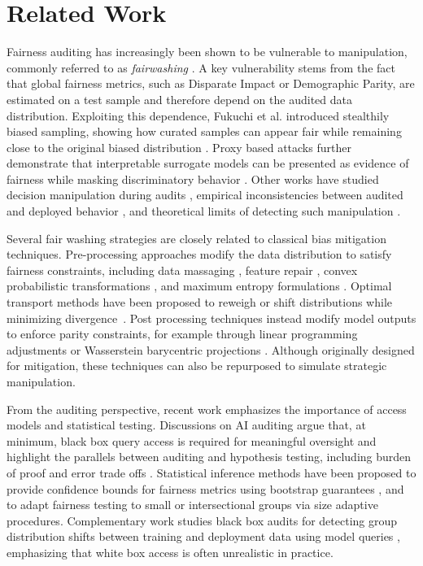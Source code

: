\documentclass[runningheads, orivec]{llncs}
\begin{document}
\section{Related Work}

Fairness auditing has increasingly been shown to be vulnerable to manipulation, commonly referred to as \emph{fairwashing} \cite{aivodji2019fairwashing}. A key vulnerability stems from the fact that global fairness metrics, such as Disparate Impact or Demographic Parity, are estimated on a test sample and therefore depend on the audited data distribution. Exploiting this dependence, Fukuchi et al. introduced stealthily biased sampling, showing how curated samples can appear fair while remaining close to the original biased distribution \cite{fukuchi2020faking}. Proxy based attacks further demonstrate that interpretable surrogate models can be presented as evidence of fairness while masking discriminatory behavior \cite{aivodji2019fairwashing}. Other works have studied decision manipulation during audits \cite{lemerrer2020faking}, empirical inconsistencies between audited and deployed behavior \cite{raji2020closing}, and theoretical limits of detecting such manipulation \cite{shamsabadi2023fairwashing}.

Several fair washing strategies are closely related to classical bias mitigation techniques. Pre-processing approaches modify the data distribution to satisfy fairness constraints, including data massaging \cite{kamiran2009classifying}, feature repair \cite{feldman2015certifying}, convex probabilistic transformations \cite{calmon2017optimized}, and maximum entropy formulations \cite{celis2019fair}. Optimal transport methods have been proposed to reweigh or shift distributions while minimizing divergence~\cite{gordaliza2019obtaining }. %
Post processing techniques instead modify model outputs to enforce parity constraints, for example through linear programming adjustments \cite{hardt2016equality} or Wasserstein barycentric projections \cite{pmlr-v115-jiang20a}. 
Although originally designed for mitigation, these techniques can also be repurposed to simulate strategic manipulation.

From the auditing perspective, recent work emphasizes the importance of access models and statistical testing. Discussions on AI auditing argue that, at minimum, black box query access is required for meaningful oversight and highlight the parallels between auditing and hypothesis testing, including burden of proof and error trade offs \cite{10.1145/3689904.3694711}. Statistical inference methods have been proposed to provide confidence bounds for fairness metrics using bootstrap guarantees \cite{JMLR:v25:23-0739}, and to adapt fairness testing to small or intersectional groups via size adaptive procedures. Complementary work studies black box audits for detecting group distribution shifts between training and deployment data using model queries \cite{juarez2022blackboxauditsgroupdistribution}, emphasizing that white box access is often unrealistic in practice.
\end{document}
